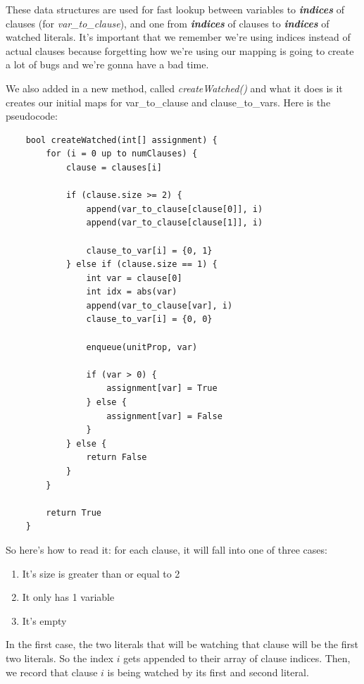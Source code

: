 \documentclass[oneside]{book}
\begin{document}
These data structures are used for fast lookup between variables to  
\textbf{\textit{indices}} of clauses (for \textit{var\_to\_clause}), and 
one from \textbf{\textit{indices}} of clauses to \textbf{\textit{indices}} of 
watched literals. It's important that we remember we're using indices instead 
of actual clauses because forgetting how we're using our mapping is going to create 
a lot of bugs and we're gonna have a bad time. 

We also added in a new method, called \textit{createWatched()} and what it does 
is it creates our initial maps for var\_to\_clause and clause\_to\_vars. 
Here is the pseudocode:

\begin{lstlisting}
    bool createWatched(int[] assignment) {
        for (i = 0 up to numClauses) {
            clause = clauses[i]

            if (clause.size >= 2) {
                append(var_to_clause[clause[0]], i)
                append(var_to_clause[clause[1]], i)

                clause_to_var[i] = {0, 1}
            } else if (clause.size == 1) {
                int var = clause[0]
                int idx = abs(var)
                append(var_to_clause[var], i)
                clause_to_var[i] = {0, 0}

                enqueue(unitProp, var)

                if (var > 0) {
                    assignment[var] = True
                } else {
                    assignment[var] = False
                }
            } else {
                return False
            }
        }

        return True
    }
\end{lstlisting}

\noindent So here's how to read it: for each clause, it will fall into one of three cases:
\begin{enumerate}
    \item It's size is greater than or equal to 2
    \item It only has 1 variable
    \item It's empty
\end{enumerate}

In the first case, the two literals that will be watching that clause will be the 
first two literals. So the index $i$ gets appended to their array of clause indices.
Then, we record that clause $i$ is being watched by its first and second literal.
\end{document}
